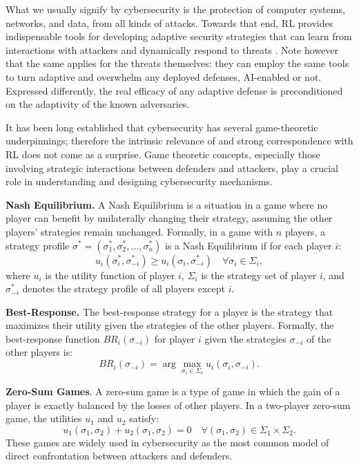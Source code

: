 What we usually signify by cybersecurity is the protection of computer systems, networks, and data, from all kinds of attacks.
Towards that end, \gls{RL} provides indispensable tools for developing adaptive security strategies that can learn from interactions with attackers and dynamically respond to threats \cite{nguyen2021deep}.
Note however that the same applies for the threats themselves: they can employ the same tools to turn adaptive and overwhelm any deployed defenses, AI-enabled or not.
Expressed differently, the real efficacy of any adaptive defense is preconditioned on the adaptivity of the known adversaries.

It has been long established that cybersecurity has several game-theoretic underpinnings; therefore the intrinsic relevance of and strong correspondence with \gls{RL} does not come as a surprise.
Game theoretic concepts, especially those involving strategic interactions between defenders and attackers, play a crucial role in understanding and designing cybersecurity mechanisms.

\textbf{Nash Equilibrium.} A Nash Equilibrium is a situation in a game where no player can benefit by unilaterally changing their strategy, assuming the other players' strategies remain unchanged.
Formally, in a game with $n$ players, a strategy profile $\sigma^* = (\sigma_1^*, \sigma_2^*, \ldots, \sigma_n^*)$ is a Nash Equilibrium if for each player $i$:
\[
u_i(\sigma_i^*, \sigma_{-i}^*) \geq u_i(\sigma_i, \sigma_{-i}^*) \quad \forall \sigma_i \in \Sigma_i,
\]
where $u_i$ is the utility function of player $i$, $\Sigma_i$ is the strategy set of player $i$, and $\sigma_{-i}^*$ denotes the strategy profile of all players except $i$.

\textbf{Best-Response.} The best-response strategy for a player is the strategy that maximizes their utility given the strategies of the other players.
Formally, the best-response function $BR_i(\sigma_{-i})$ for player $i$ given the strategies $\sigma_{-i}$ of the other players is:
\[
BR_i(\sigma_{-i}) = \arg\max_{\sigma_i \in \Sigma_i} u_i(\sigma_i, \sigma_{-i}).
\]

\textbf{Zero-Sum Games}. A zero-sum game is a type of game in which the gain of a player is exactly balanced by the losses of other players.
In a two-player zero-sum game, the utilities $u_1$ and $u_2$ satisfy:
\[
u_1(\sigma_1, \sigma_2) + u_2(\sigma_1, \sigma_2) = 0 \quad \forall (\sigma_1, \sigma_2) \in \Sigma_1 \times \Sigma_2.
\]
These games are widely used in cybersecurity as the most common model of direct confrontation between attackers and defenders.


